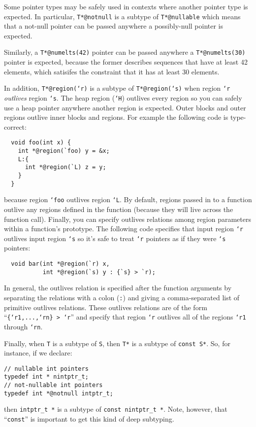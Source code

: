 Some pointer types may be safely used in contexts where another
pointer type is expected.  In particular, \texttt{T*@notnull} is a
subtype of \texttt{T*@nullable} which means that a not-null pointer
can be passed anywhere a possibly-null pointer is expected.

Similarly, a \texttt{T*@numelts(42)} pointer can be passed anywhere a
\texttt{T*@numelts(30)} pointer is expected, because the former
describes sequences that have at least 42 elements, which satisifes
the constraint that it has at least 30 elements.

In addition, \texttt{T*@region(`r)} is a subtype of \texttt{T*@region(`s)}
when region \texttt{`r} \emph{outlives} region \texttt{`s}.  The
heap region (\texttt{`H}) outlives every region so you can safely
use a heap pointer anywhere another region is expected.  Outer
blocks and outer regions outlive inner blocks and regions.  For
example the following code is type-correct:
\begin{verbatim}
  void foo(int x) {
    int *@region(`foo) y = &x;
    L:{
      int *@region(`L) z = y;
    }
  }
\end{verbatim}
because region \texttt{`foo} outlives region \texttt{`L}.  By
default, regions passed in to a function outlive any regions
defined in the function (because they will live across the
function call).  Finally, you can specify outlives relations
among region parameters within a function's prototype.  The
following code specifies that input region \texttt{`r} outlives
input region \texttt{`s} so it's safe to treat \texttt{`r} pointers
as if they were \texttt{`s} pointers:
\begin{verbatim}
  void bar(int *@region(`r) x,
           int *@region(`s) y : {`s} > `r);
\end{verbatim}
In general, the outlives relation is specified after the function
arguments by separating the relations with a colon (\texttt{:}) and
giving a comma-separated list of primitive outlives relations.
These outlives relations are of the form ``\texttt{\{`r1,...,`rn\} > `r}''
and specify that region \texttt{`r} outlives all of the regions
\texttt{`r1} through \texttt{`rn}.

Finally, when \texttt{T} is a subtype of \texttt{S}, then
\texttt{T*} is a subtype of \texttt{const S*}.  So, for
instance, if we declare:
\begin{verbatim}
// nullable int pointers
typedef int * nintptr_t;
// not-nullable int pointers
typedef int *@notnull intptr_t;
\end{verbatim}
then \texttt{intptr_t *} is a subtype of \texttt{const nintptr_t *}.
Note, however, that ``\texttt{const}'' is important to get this
kind of deep subtyping.  

